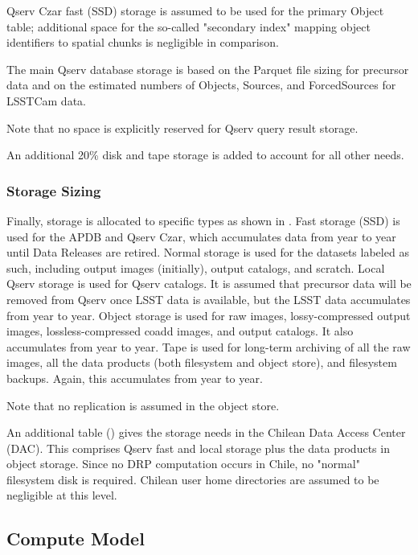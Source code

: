 Qserv Czar fast (SSD) storage is assumed to be used for the primary Object table; additional space for the so-called "secondary index" mapping object identifiers to spatial chunks is negligible in comparison.

The main Qserv database storage is based on the Parquet file sizing for precursor data and on the estimated numbers of Objects, Sources, and ForcedSources for LSSTCam data.

Note that no space is explicitly reserved for Qserv query result storage.

An additional 20\% disk and tape storage is added to account for all other needs.



\subsubsection{Storage Sizing}

Finally, storage is allocated to specific types as shown in .
Fast storage (SSD) is used for the APDB and Qserv Czar, which accumulates data from year to year until Data Releases are retired.
Normal storage is used for the datasets labeled as such, including output images (initially), output catalogs, and scratch.
Local Qserv storage is used for Qserv catalogs.
It is assumed that precursor data will be removed from Qserv once LSST data is available, but the LSST data accumulates from year to year.
Object storage is used for raw images, lossy-compressed output images, lossless-compressed coadd images, and output catalogs.
It also accumulates from year to year.
Tape is used for long-term archiving of all the raw images, all the data products (both filesystem and object store), and filesystem backups.
Again, this accumulates from year to year.

Note that no replication is assumed in the object store.



An additional table () gives the storage needs in the Chilean Data Access Center (DAC).
This comprises Qserv fast and local storage plus the data products in object storage.
Since no DRP computation occurs in Chile, no "normal" filesystem disk is required.
Chilean user home directories are assumed to be negligible at this level.



\subsection{Compute Model}

